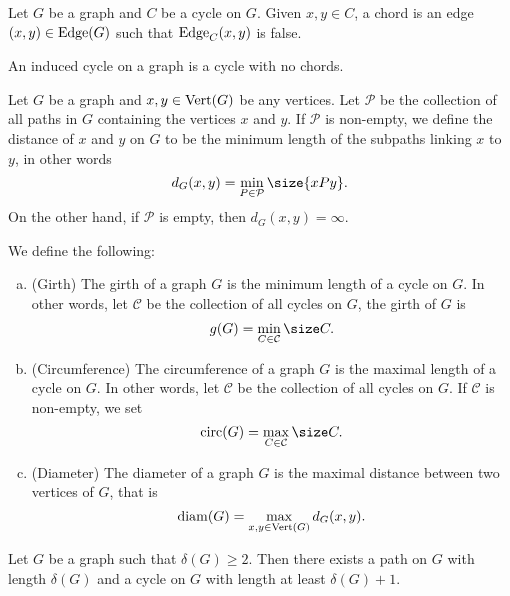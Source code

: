 \begin{definition}[Chords]\label{def: chord}
    Let \(G\) be a graph and \(C\) be a cycle on \(G\). Given \(x, y \in C\), a
    chord is an edge \((x, y) \in \operatorname{Edge}(G)\) such that \(\operatorname{Edge}_C(x, y)\) is false.
\end{definition}

\begin{definition}\label{def: induced-cycle}
    An induced cycle on a graph is a cycle with no chords.
\end{definition}

\begin{definition}[Distance]\label{def: vertex-distance}
    Let \(G\) be a graph and \(x, y \in \operatorname{Vert}(G)\) be any vertices. Let \(\mathcal P\)
    be the collection of all paths in \(G\) containing the vertices \(x\) and
    \(y\). If \(\mathcal P\) is non-empty, we define the distance of \(x\) and
    \(y\) on \(G\) to be the minimum length of the subpaths linking \(x\) to
    \(y\), in other words
    \[
        d_G(x, y) = \min_{P \in \mathcal P} \size{xPy}.
    \]
    On the other hand, if \(\mathcal P\) is empty, then \(d_G(x, y) = \infty\).
\end{definition}

\begin{definition}
    \label{def: miscellaneous-graph-cycle}
    We define the following:
    \begin{enumerate}[(a).]
        \setlength\itemsep{0.0em}
        \item\label{def: girth}
        (Girth) The girth of a graph \(G\) is the minimum length of a cycle on
        \(G\). In other words, let \(\mathcal C\) be the collection of all cycles
        on \(G\), the girth of \(G\) is
        \[
            g(G) = \min_{C \in \mathcal C} \size C.
        \]
        \item\label{def: circ-graph}
        (Circumference) The circumference of a graph \(G\) is the maximal length
        of a cycle on \(G\). In other words, let \(\mathcal C\) be the collection
        of all cycles on \(G\). If \(\mathcal C\) is non-empty, we set
        \[
            \Circ(G) = \max_{C \in \mathcal C} \size C.
        \]
        \item\label{def: diameter}
        (Diameter) The diameter of a graph \(G\) is the maximal distance between
        two vertices of \(G\), that is
        \[
            \operatorname{diam}(G) = \max_{x, y \in \operatorname{Vert}(G)} d_G(x, y).
        \]
    \end{enumerate}
\end{definition}

\begin{proposition}\label{prop: path-cycle-len-delta}
    Let \(G\) be a graph such that \(\delta(G) \geq 2\). Then there exists a path
    on \(G\) with length \(\delta(G)\) and a cycle on \(G\) with length at least
    \(\delta(G) + 1\).
\end{proposition}

